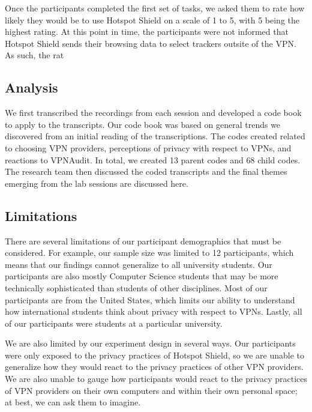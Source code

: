 Once the participants completed the first set of tasks, we asked them to rate how likely they would be to use Hotspot Shield on a scale of 1 to 5, with 5 being the highest rating.
At this point in time, the participants were not informed that Hotspot Shield sends their browsing data to select trackers outsite of the VPN.
As such, the rat


\subsection{Analysis}
We first transcribed the recordings from each session and developed a code book to apply to the transcripts.
Our code book was based on general trends we discovered from an initial reading of the transcriptions.
The codes created related to choosing VPN providers, perceptions of privacy with respect to VPNs, and reactions to VPNAudit.
In total, we created 13 parent codes and 68 child codes.  The research team then discussed the coded transcripts and the final themes emerging from the lab sessions are discussed here.

\subsection{Limitations}
There are several limitations of our participant demographics that must be considered.
For example, our sample size was limited to 12 participants, which means that our findings cannot generalize to all university students.
Our participants are also mostly Computer Science students that may be more technically sophisticated than students of other disciplines.
Most of our participants are from the United States, which limits our ability to understand how international students think about privacy with respect to VPNs.
Lastly, all of our participants were students at a particular university.

We are also limited by our experiment design in several ways.
Our participants were only exposed to the privacy practices of Hotspot Shield, so we are unable to generalize how they would react to the privacy practices of other VPN providers.
We are also unable to gauge how participants would react to the privacy practices of VPN providers on their own computers and within their own personal space; at best, we can ask them to imagine.